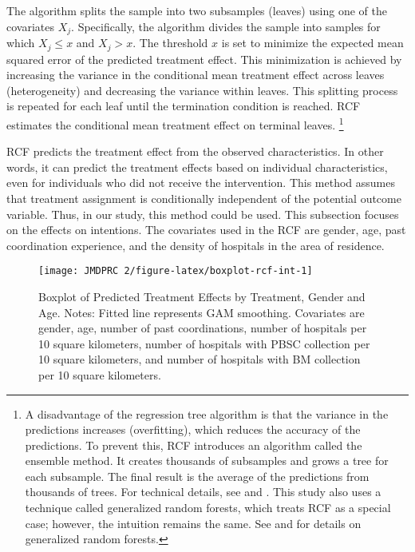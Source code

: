 \documentclass[12pt, a4paper]{article}
\begin{document}
The algorithm splits the sample into two subsamples (leaves) using one of the covariates \(X_j\). Specifically, the algorithm divides the sample into samples for which \(X_j \le x\) and \(X_j > x\). The threshold \(x\) is set to minimize the expected mean squared error of the predicted treatment effect. This minimization is achieved by increasing the variance in the conditional mean treatment effect across leaves (heterogeneity) and decreasing the variance within leaves. This splitting process is repeated for each leaf until the termination condition is reached. RCF estimates the conditional mean treatment effect on terminal leaves. \footnote{A disadvantage of the regression tree algorithm is that the variance in the predictions increases (overfitting), which reduces the accuracy of the predictions. To prevent this, RCF introduces an algorithm called the ensemble method. It creates thousands of subsamples and grows a tree for each subsample. The final result is the average of the predictions from thousands of trees. For technical details, see \citet{Athey2016} and \citet{Wager2018}. This study also uses a technique called generalized random forests, which treats RCF as a special case; however, the intuition remains the same. See \citet{Athey2019} and \citet{Athey2019a} for details on generalized random forests.}

RCF predicts the treatment effect from the observed characteristics. In other words, it can predict the treatment effects based on individual characteristics, even for individuals who did not receive the intervention. This method assumes that treatment assignment is conditionally independent of the potential outcome variable. Thus, in our study, this method could be used. This subsection focuses on the effects on intentions. The covariates used in the RCF are gender, age, past coordination experience, and the density of hospitals in the area of residence.

\begin{figure}[t]
\texttt{[image: JMDPRC~2/figure-latex/boxplot-rcf-int-1]} \caption{Boxplot of Predicted Treatment Effects by Treatment, Gender and Age. Notes: Fitted line represents GAM smoothing. Covariates are gender, age, number of past coordinations, number of hospitals per 10 square kilometers, number of hospitals with PBSC collection per 10 square kilometers, and number of hospitals with BM collection per 10 square kilometers.}\label{fig:boxplot-rcf-int}
\end{figure}
\end{document}
